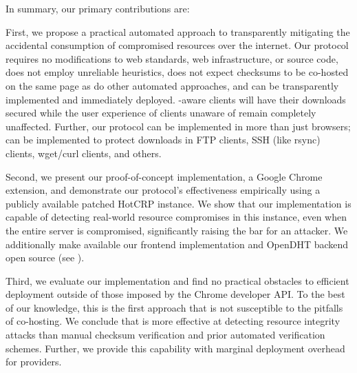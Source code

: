 In summary, our primary contributions are:

First, we propose a practical automated approach to transparently mitigating the
accidental consumption of compromised resources over the internet. Our protocol
requires no modifications to web standards, web infrastructure, or source code,
does not employ unreliable heuristics, does not expect checksums to be co-hosted
on the same page as do other automated approaches, and can be transparently
implemented and immediately deployed. \SYSTEM{}-aware clients will have their
downloads secured while the user experience of clients unaware of \SYSTEM{}
remain completely unaffected. Further, our protocol can be implemented in more
than just browsers; \SYSTEM{} can be implemented to protect downloads in FTP
clients, SSH (like rsync) clients, wget/curl clients, and others.

Second, we present our proof-of-concept implementation, a Google Chrome extension,
and demonstrate our protocol's effectiveness empirically using a publicly
available patched HotCRP instance. We show that our implementation is capable of
detecting real-world resource compromises in this instance, even when the entire
server is compromised, significantly raising the bar for an attacker. We
additionally make available our frontend implementation and OpenDHT backend open
source (see ).

Third, we evaluate our implementation and find no practical obstacles to efficient
deployment outside of those imposed by the Chrome developer API. To the best of
our knowledge, this is the first approach that is not susceptible to the
pitfalls of co-hosting. We conclude that \SYSTEM{} is more effective at
detecting resource integrity attacks than manual checksum verification and prior
automated verification schemes. Further, we provide this capability with
marginal deployment overhead for providers.
